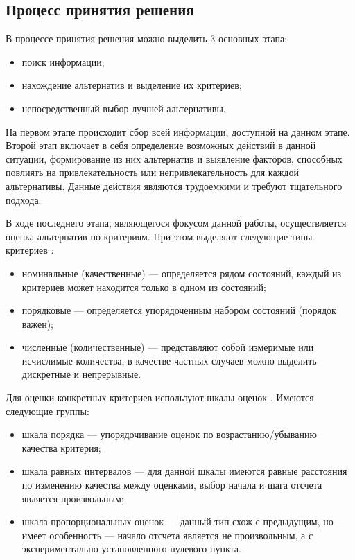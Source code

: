 \subsection{Процесс принятия решения}

В процессе принятия решения можно выделить 3 основных этапа:
\begin{itemize}
	\item поиск информации;
	\item нахождение альтернатив и выделение их критериев;
	\item непосредственный выбор лучшей альтернативы.
\end{itemize}

На первом этапе происходит сбор всей информации, доступной на данном этапе. Второй этап включает в себя определение возможных действий в данной ситуации, формирование из них альтернатив и выявление факторов, способных повлиять на привлекательность или непривлекательность для каждой альтернативы. Данные действия являются трудоемкими и требуют тщательного подхода.


В ходе последнего этапа, являющегося фокусом данной работы, осуществляется оценка альтернатив по критериям. При этом выделяют следующие типы критериев \cite{param_classes}:
\begin{itemize}
	\item номинальные (качественные) --- определяется рядом состояний, каждый из критериев может находится только в одном из состояний;
	\item порядковые --- определяется упорядоченным набором состояний (порядок важен);
	\item численные (количественные) --- представляют собой измеримые или исчислимые количества, в качестве частных случаев можно выделить дискретные и непрерывные.
\end{itemize}

Для оценки конкретных критериев используют шкалы оценок \cite{Larychev}. Имеются следующие группы:
\begin{itemize}
	\item шкала порядка --- упорядочивание оценок по возрастанию/убыванию качества критерия;
	\item шкала равных интервалов --- для данной шкалы имеются равные расстояния по изменению качества между оценками, выбор начала и шага отсчета является произвольным;
	\item шкала пропорциональных оценок --- данный тип схож с предыдущим, но имеет особенность --- начало отсчета является не произвольным, а с экспериментально установленного нулевого пункта.
\end{itemize}

